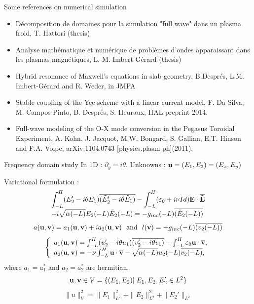 \begin{frame}{Some references on numerical simulation}
\begin{itemize}
\item Décomposition de domaines pour la simulation "full wave" dans un plasma froid, T. Hattori (thesis) \\ 
\item Analyse mathématique et numérique de problèmes d’ondes apparaissant dans les plasmas
magnétiques, L.-M. Imbert-Gérard (thesis)\\ 
\item Hybrid resonance of Maxwell's equations in slab geometry, B.Després, L.M. Imbert-Gérard and R. Weder, in JMPA\\ 
\item  Stable coupling of the Yee scheme with a linear current model, F. Da Silva, M. Campos-Pinto, B. Després, S. Heuraux, HAL preprint 2014. \\ 
\item Full-wave modeling of the O-X mode conversion in the Pegasus Toroidal Experiment, A. Kohn, J. Jacquot, M.W. Bongard, S. Gallian, E.T. Hinson and F.A. Volpe, arXiv:1104.0743 [physics.plasm-ph](2011).
\end{itemize}
\end{frame}
\begin{frame}{Frequency domain study}
In 1D :  $\partial_y = i \theta$. Unknowns : ${\bf u} =(E_1,E_2) = (E_x,E_y)$


\alert{Variational formulation :}
\[
\begin{array}{l}
\displaystyle \int_{-L}^H (E_2' -i\theta E_1)\overline{(\tilde E_2' -i \theta \tilde E_1)} - \int_{-L}^H ({\bf \varepsilon}_0 +i\nu Id) {\bf E} \cdot \overline{\tilde {{\bf E}}}
\\ \displaystyle  - i \sqrt{\alpha(-L)} E_2 (-L) \tilde E_2 (-L) = -g_{inc} (-L) \overline{( \tilde E_2(-L) )} 
\end{array}
\]
\[
a({\bf u},{\bf v}) = a_1 ({\bf u},{\bf v}) +i a_2({\bf u},{\bf v})\  \text{ and } \  l({\bf v}) = -g_{inc} (-L) \overline{(v_2(-L) )} 
\]
\[
\left\{\begin{array}{l}
a_1({\bf u},{\bf v}) = \int_{-L}^H (u_2' -i\theta u_1)\overline{(v_2' -i \theta v_1)} - \int_{-L}^H {\bf \varepsilon}_0 {\bf u}\cdot \overline{{\bf v}}, 
\\ a_2({\bf u},{\bf v}) = -\nu \int_{-L}^H  {\bf u}\cdot \overline{{\bf v}} -  \sqrt{\alpha(-L)} u_2 (-L) \overline{v_2 (-L)} , 
\end{array}\right.
\]
where $a_1= a_1^*$ and $a_2=a_2^*$ are hermitian.
\[
{\bf u},{\bf v} \in V =  \{ (E_1,E_2) |\; E_1,E_2,E_2'  \in L^2\}
\]
\[
\|u\|_{V}^2 = \|E_1\|^2_{L^2} + \|E_2\|^2_{L^2} + \|E_2'\|_{L^2}
\]
\end{frame}
